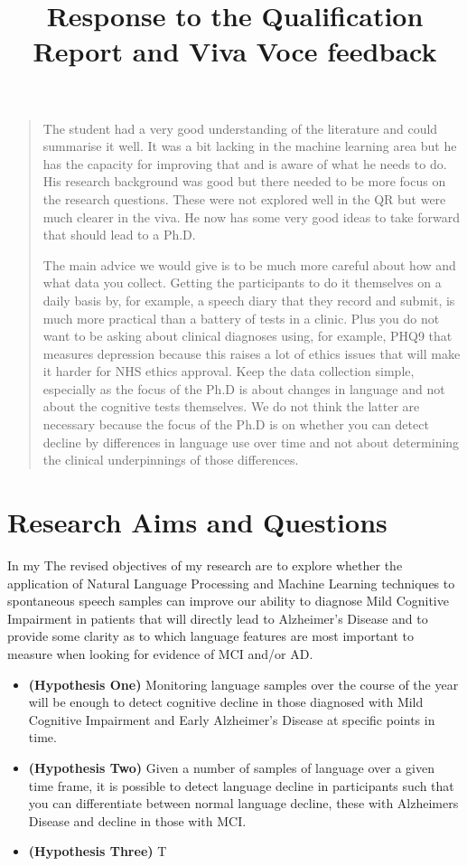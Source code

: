 \documentclass[11pt]{article}
\begin{document}
\title{Response to the Qualification Report and Viva Voce feedback}
\maketitle
\par 
\begin{quote}
The student had a very good understanding of the literature and could summarise it well. It was a bit lacking in the machine learning area but he has the capacity for improving that and is aware of what he needs to do. His research background was good but there needed to be more focus on the research questions. These were not explored well in the QR but were much clearer in the viva. He now has some very good ideas to take forward that should lead to a Ph.D.
\par 
\bigskip
The main advice we would give is to be much more careful about how and what data you collect. Getting the participants to do it themselves on a daily basis by, for example, a speech diary that they record and submit, is much more practical than a battery of tests in a clinic. Plus you do not want to be asking about clinical diagnoses using, for example, PHQ9 that measures depression because this raises a lot of ethics issues that will make it harder for NHS ethics approval. Keep the data collection simple, especially as the focus of the Ph.D is about changes in language and not about the cognitive tests themselves. We do not think the latter are necessary because the focus of the Ph.D is on whether you can detect decline by differences in language use over time and not about determining the clinical underpinnings of those differences.
\end{quote}

\section{Research Aims and Questions}
In my The revised objectives of my research are to explore whether the application of Natural Language Processing and Machine Learning techniques to spontaneous speech samples can improve our ability to diagnose Mild Cognitive Impairment in patients that will directly lead to Alzheimer's Disease and to provide some clarity as to which language features are most important to measure when looking for evidence of MCI and/or AD. 
\begin{itemize}
	\item \textbf{(Hypothesis One)} Monitoring language samples over the course of the year will be enough to detect cognitive decline in those diagnosed with Mild Cognitive Impairment and Early Alzheimer's Disease at specific points in time.
	\item \textbf{(Hypothesis Two)} Given a number of samples of language over a given time frame, it is possible to detect language decline in participants such that you can differentiate between normal language decline, these with Alzheimers Disease and decline in those with MCI.
	\item \textbf{(Hypothesis Three)} T
\end{itemize}
\end{document}
